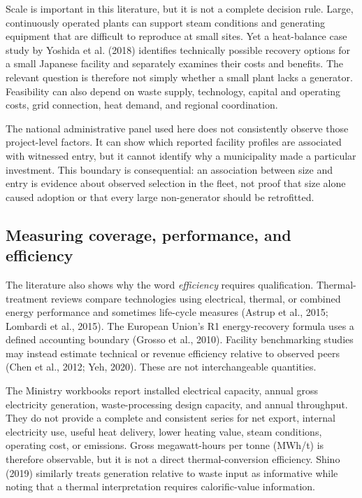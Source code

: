 \documentclass[12pt,letterpaper]{article}
\begin{document}
Scale is important in this literature, but it is not a complete decision rule.
Large, continuously operated plants can support steam conditions and generating
equipment that are difficult to reproduce at small sites. Yet a heat-balance case
study by Yoshida et al. (2018) identifies technically possible recovery options
for a small Japanese facility and separately examines their costs and benefits.
The relevant question is therefore not simply whether a small plant lacks a
generator. Feasibility can also depend on waste supply, technology, capital and
operating costs, grid connection, heat demand, and regional coordination.

The national administrative panel used here does not consistently observe those
project-level factors. It can show which reported facility profiles are
associated with witnessed entry, but it cannot identify why a municipality made
a particular investment. This boundary is consequential: an association between
size and entry is evidence about observed selection in the fleet, not proof that
size alone caused adoption or that every large non-generator should be
retrofitted.

\subsection{Measuring coverage, performance, and efficiency}

The literature also shows why the word \emph{efficiency} requires qualification.
Thermal-treatment reviews compare technologies using electrical, thermal, or
combined energy performance and sometimes life-cycle measures (Astrup et al.,
2015; Lombardi et al., 2015). The European Union's R1 energy-recovery formula
uses a defined accounting boundary (Grosso et al., 2010).
Facility benchmarking studies may instead estimate technical or revenue
efficiency relative to observed peers (Chen et al., 2012; Yeh, 2020). These are
not interchangeable quantities.

The Ministry workbooks report installed electrical capacity, annual gross
electricity generation, waste-processing design capacity, and annual throughput.
They do not provide a complete and consistent series for net export, internal
electricity use, useful heat delivery, lower heating value, steam conditions,
operating cost, or emissions. Gross megawatt-hours per tonne (MWh/t) is therefore
observable, but it is not a direct thermal-conversion efficiency. Shino (2019)
similarly treats generation relative to waste input as informative while noting
that a thermal interpretation requires calorific-value information.
\end{document}

